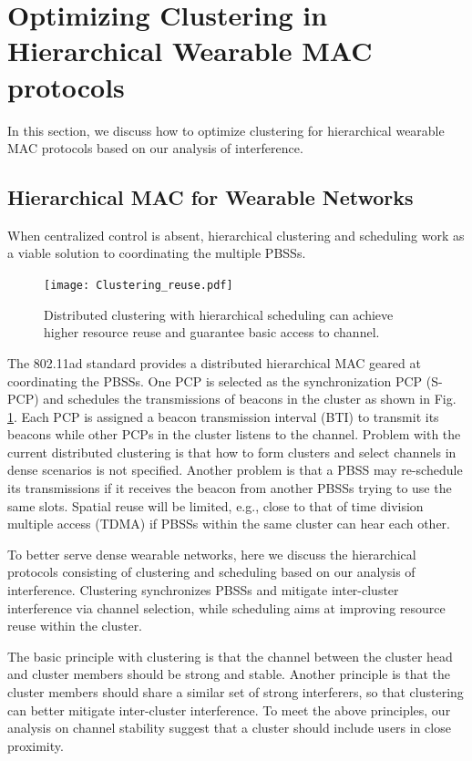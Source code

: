 \documentclass[10pt, conference, letterpaper]{IEEEtran}
\begin{document}
\section{Optimizing Clustering in Hierarchical Wearable MAC protocols}\label{section:clustering}
In this section, we discuss how to optimize clustering for hierarchical wearable MAC protocols based on our analysis of interference.

\subsection{Hierarchical MAC for Wearable Networks}\label{section:clustering:hierarchy}
When centralized control is absent, hierarchical clustering and scheduling work as a viable solution to coordinating the multiple PBSSs. 

\begin{figure}
	\centering
	\texttt{[image: Clustering\_reuse.pdf]}
	\caption{Distributed clustering  with hierarchical scheduling can achieve higher resource reuse and guarantee basic access to channel.}
	\label{fig:clustering:reuse}
\end{figure}

The 802.11ad standard provides a distributed hierarchical MAC geared at coordinating the PBSSs. One PCP is selected as the synchronization PCP (S-PCP) and schedules the transmissions of beacons in the cluster as shown in Fig. \ref{fig:clustering:reuse}. Each PCP is assigned a beacon transmission interval (BTI) to transmit its beacons while other PCPs in the cluster listens to the channel. Problem with the current distributed clustering is that how to form clusters and select channels in dense scenarios is not specified. 
Another problem is that a PBSS may re-schedule its transmissions if it receives the beacon from another PBSSs trying to use the same slots. 
Spatial reuse will be limited, e.g., close to that of time division multiple access (TDMA) if PBSSs within the same cluster can hear each other.

To better serve dense wearable networks, here we discuss the hierarchical protocols consisting of clustering and scheduling based on our analysis of interference. Clustering synchronizes PBSSs and mitigate inter-cluster interference via channel selection, while scheduling aims at improving resource reuse within the cluster. 

The basic principle with clustering is that the channel between the cluster head and cluster members should be strong and stable. 
Another principle is that the cluster members should share a similar set of strong interferers, so that clustering can better mitigate inter-cluster interference.
To meet the above principles, our analysis on channel stability suggest that a cluster should include users in close proximity.
\end{document}
